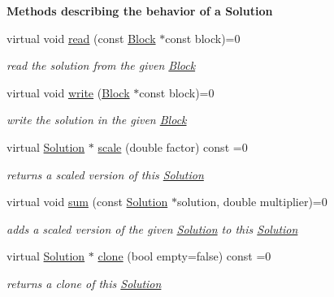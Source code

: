 \begin{Indent}\textbf{ Methods describing the behavior of a Solution}\par
\begin{DoxyCompactItemize}
\item 
virtual void \mbox{\hyperlink{class_s_m_spp__di__unipi__it_1_1_solution_ae22668fc6d3d5794e6a881953898aa6b}{read}} (const \mbox{\hyperlink{class_s_m_spp__di__unipi__it_1_1_block}{Block}} $\ast$const block)=0
\begin{DoxyCompactList}\small\item\em read the solution from the given \mbox{\hyperlink{class_s_m_spp__di__unipi__it_1_1_block}{Block}} \end{DoxyCompactList}\item 
virtual void \mbox{\hyperlink{class_s_m_spp__di__unipi__it_1_1_solution_a6ba3f1b8f44f35e6a56fc0795587f68a}{write}} (\mbox{\hyperlink{class_s_m_spp__di__unipi__it_1_1_block}{Block}} $\ast$const block)=0
\begin{DoxyCompactList}\small\item\em write the solution in the given \mbox{\hyperlink{class_s_m_spp__di__unipi__it_1_1_block}{Block}} \end{DoxyCompactList}\item 
virtual \mbox{\hyperlink{class_s_m_spp__di__unipi__it_1_1_solution}{Solution}} $\ast$ \mbox{\hyperlink{class_s_m_spp__di__unipi__it_1_1_solution_abf1a2d1763f128a72b2677d4b9ff4d3b}{scale}} (double factor) const =0
\begin{DoxyCompactList}\small\item\em returns a scaled version of this \mbox{\hyperlink{class_s_m_spp__di__unipi__it_1_1_solution}{Solution}} \end{DoxyCompactList}\item 
virtual void \mbox{\hyperlink{class_s_m_spp__di__unipi__it_1_1_solution_adc2450947fd142657637bf79d91505a9}{sum}} (const \mbox{\hyperlink{class_s_m_spp__di__unipi__it_1_1_solution}{Solution}} $\ast$solution, double multiplier)=0
\begin{DoxyCompactList}\small\item\em adds a scaled version of the given \mbox{\hyperlink{class_s_m_spp__di__unipi__it_1_1_solution}{Solution}} to this \mbox{\hyperlink{class_s_m_spp__di__unipi__it_1_1_solution}{Solution}} \end{DoxyCompactList}\item 
virtual \mbox{\hyperlink{class_s_m_spp__di__unipi__it_1_1_solution}{Solution}} $\ast$ \mbox{\hyperlink{class_s_m_spp__di__unipi__it_1_1_solution_a02ecf9046100701d7bcc800deaa5717b}{clone}} (bool empty=false) const =0
\begin{DoxyCompactList}\small\item\em returns a clone of this \mbox{\hyperlink{class_s_m_spp__di__unipi__it_1_1_solution}{Solution}} \end{DoxyCompactList}\end{DoxyCompactItemize}
\end{Indent}
